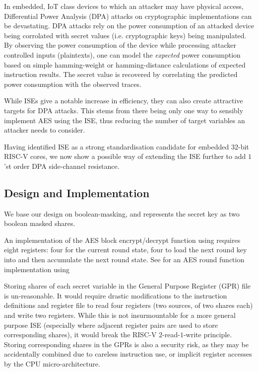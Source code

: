 
In embedded, IoT class devices to which an attacker may have
physical access,
Differential Power Analysis (DPA) attacks on cryptographic implementations
\cite{KJJ:99} can be devastating.
DPA attacks rely on the power consumption of an attacked device being
corrolated with secret values (i.e. cryptographic keys) being manipulated.
By observing the power consumption of the device while processing
attacker controlled inputs (plaintexts), one can model the {\em expected}
power consumption based on simple hamming-weight or hamming-distance
calculations of expected instruction results.
The secret value is recovered by correlating the predicted power
consumption with the observed traces.

While ISEs give a notable increase in efficiency, they can also create
attractive targets for DPA attacks.
This stems from there being only one way to sensibly implement
AES using the ISE, thus reducing the number of target variables an
attacker needs to consider.

Having identified ISE  as a strong standardisation candidate
for embedded $32$-bit RISC-V cores, we now show a possible
way of extending the ISE further to add 
$1$'st order DPA side-channel resistance.

\subsection{Design and Implementation}

We base our design on boolean-masking, and represents the secret
key as two boolean masked shares.

An implementation of the AES block encrypt/decrypt function 
using  requires eight registers:
four for the current round state,
four to load the next round key into and then accumulate the next round state.
See  for an AES round function implementation
using 

Storing shares of each secret variable
in the General Purpose Register (GPR) file is un-reasonable.
It would require drastic modifications to the instruction definitions and
register file to read four registers (two sources, of two shares each) and
write two registers.
While this is not insurmountable for a more general purpose ISE
(especially where adjacent register pairs are used to store corresponding
shares),
it would break the RISC-V $2$-read-$1$-write principle.
Storing corresponding shares in the GPRs is also a security
risk, as they may be accidentally combined due to
careless instruction use, or implicit register accesses by the
CPU micro-architecture.

